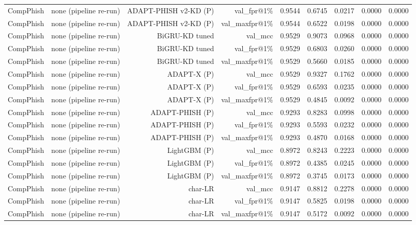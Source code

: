 \begin{table}[t]
\begin{tabular}{llrrrrrrr}
CompPhish & none (pipeline re-run) & ADAPT-PHISH v2-KD (P) & val\_fpr@1\% & 0.9544 & 0.6745 & 0.0217 & 0.0000 & 0.0000 \\
CompPhish & none (pipeline re-run) & ADAPT-PHISH v2-KD (P) & val\_maxfpr@1\% & 0.9544 & 0.6522 & 0.0198 & 0.0000 & 0.0000 \\
CompPhish & none (pipeline re-run) & BiGRU-KD tuned & val\_mcc & 0.9529 & 0.9073 & 0.0968 & 0.0000 & 0.0000 \\
CompPhish & none (pipeline re-run) & BiGRU-KD tuned & val\_fpr@1\% & 0.9529 & 0.6803 & 0.0260 & 0.0000 & 0.0000 \\
CompPhish & none (pipeline re-run) & BiGRU-KD tuned & val\_maxfpr@1\% & 0.9529 & 0.5660 & 0.0185 & 0.0000 & 0.0000 \\
CompPhish & none (pipeline re-run) & ADAPT-X (P) & val\_mcc & 0.9529 & 0.9327 & 0.1762 & 0.0000 & 0.0000 \\
CompPhish & none (pipeline re-run) & ADAPT-X (P) & val\_fpr@1\% & 0.9529 & 0.6593 & 0.0235 & 0.0000 & 0.0000 \\
CompPhish & none (pipeline re-run) & ADAPT-X (P) & val\_maxfpr@1\% & 0.9529 & 0.4845 & 0.0092 & 0.0000 & 0.0000 \\
CompPhish & none (pipeline re-run) & ADAPT-PHISH (P) & val\_mcc & 0.9293 & 0.8283 & 0.0998 & 0.0000 & 0.0000 \\
CompPhish & none (pipeline re-run) & ADAPT-PHISH (P) & val\_fpr@1\% & 0.9293 & 0.5593 & 0.0232 & 0.0000 & 0.0000 \\
CompPhish & none (pipeline re-run) & ADAPT-PHISH (P) & val\_maxfpr@1\% & 0.9293 & 0.4870 & 0.0168 & 0.0000 & 0.0000 \\
CompPhish & none (pipeline re-run) & LightGBM (P) & val\_mcc & 0.8972 & 0.8243 & 0.2223 & 0.0000 & 0.0000 \\
CompPhish & none (pipeline re-run) & LightGBM (P) & val\_fpr@1\% & 0.8972 & 0.4385 & 0.0245 & 0.0000 & 0.0000 \\
CompPhish & none (pipeline re-run) & LightGBM (P) & val\_maxfpr@1\% & 0.8972 & 0.3745 & 0.0173 & 0.0000 & 0.0000 \\
CompPhish & none (pipeline re-run) & char-LR & val\_mcc & 0.9147 & 0.8812 & 0.2278 & 0.0000 & 0.0000 \\
CompPhish & none (pipeline re-run) & char-LR & val\_fpr@1\% & 0.9147 & 0.5825 & 0.0198 & 0.0000 & 0.0000 \\
CompPhish & none (pipeline re-run) & char-LR & val\_maxfpr@1\% & 0.9147 & 0.5172 & 0.0092 & 0.0000 & 0.0000 \\

\end{tabular}
\end{table}
